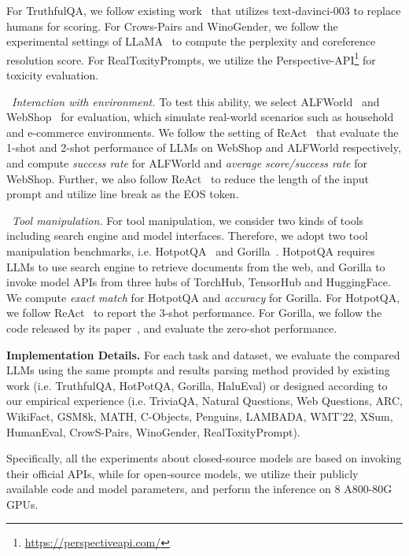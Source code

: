 {{{For TruthfulQA, we follow existing work~\cite{Touvron-arxiv-2023-LLaMA} that utilizes text-davinci-003 to replace humans for scoring.} For Crows-Pairs and WinoGender, we follow the experimental settings of LLaMA~\cite{Touvron-arxiv-2023-LLaMA} to compute the perplexity and coreference resolution score. For RealToxityPrompts, we utilize the  {Perspective-API\footnote{\url{https://perspectiveapi.com/}}} for toxicity evaluation.

\textbullet~\emph{Interaction with environment.} To test this ability, we select ALFWorld~\cite{Shridhar-2021-iclr-ALFWorld} and WebShop~\cite{Yao-2022-nips-WebShop} for evaluation, which simulate real-world scenarios such as household and e-commerce environments. We follow the setting of ReAct~\cite{Yao-2022-arXiv-react} that evaluate the 1-shot and 2-shot performance of LLMs on WebShop and ALFWorld respectively, and compute \emph{success rate} for ALFWorld and \emph{average score/success rate} for WebShop. Further, we also follow ReAct~\cite{Yao-2022-arXiv-react} to reduce the length of the input prompt and utilize line break as the EOS token.

\textbullet~\emph{Tool manipulation.} For tool manipulation, we consider two kinds of tools including search engine and model interfaces. Therefore, we adopt two tool manipulation benchmarks, i.e. HotpotQA~\cite{yang-2018-acl-HotpotQA} and Gorilla~\cite{Patil-2023-arxiv-Gorilla}. HotpotQA requires LLMs to use search engine to retrieve documents from the web, and Gorilla to invoke model APIs from three hubs of TorchHub, TensorHub and HuggingFace. We compute \emph{exact match} for HotpotQA and \emph{accuracy} for Gorilla. For HotpotQA, we follow ReAct~\cite{Yao-2022-arXiv-react} to report the 3-shot performance. For Gorilla, we follow the code released by its paper~\cite{Patil-2023-arxiv-Gorilla}, and evaluate the zero-shot performance.

\textbf{Implementation Details.} For each task and dataset, we evaluate the compared LLMs using the same prompts and results parsing method provided by existing work  {(i.e. TruthfulQA, HotPotQA, Gorilla, HaluEval)} or designed according to our empirical experience  {(i.e. TriviaQA, Natural Questions, Web Questions, ARC, WikiFact, GSM8k, MATH, C-Objects, Penguins, LAMBADA, WMT'22, XSum, HumanEval, CrowS-Pairs, WinoGender, RealToxityPrompt).}

Specifically, all the experiments about closed-source models are based on invoking their official APIs, while for open-source models, we utilize their publicly available code and model parameters, and perform the inference on 8 A800-80G GPUs.

}}

